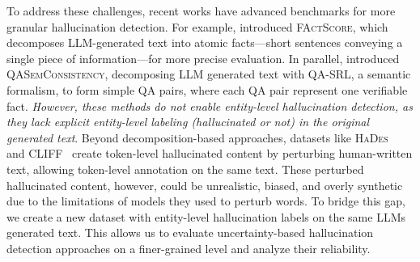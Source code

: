 To address these challenges, recent works have advanced benchmarks for more granular hallucination detection. For example, \citet{min-etal-2023-factscore} introduced \textsc{FActScore}, which decomposes LLM-generated text into atomic facts---short sentences conveying a single piece of information---for more precise evaluation. In parallel, \citet{cattan2024localizingfactualinconsistenciesattributable} introduced \textsc{QASemConsistency}, decomposing LLM generated text with QA-SRL, a semantic formalism, to form simple QA pairs, where each QA pair represent one verifiable fact. \emph{However, these methods do not enable entity-level hallucination detection, as they lack explicit entity-level labeling (hallucinated or not) in the original generated text}.  
Beyond decomposition-based approaches, datasets like \textsc{HaDes}~\citep{liu-etal-2022-token} and CLIFF~\citep{cao-wang-2021-cliff} create token-level hallucinated content by perturbing human-written text, allowing token-level annotation on the same text. These perturbed hallucinated content, however, could be unrealistic, biased, and overly synthetic due to the limitations of models they used to perturb words. 
To bridge this gap, we create a new dataset with entity-level hallucination labels on the same LLMs generated text. This allows us to evaluate uncertainty-based hallucination detection approaches on a finer-grained level and analyze their reliability.




